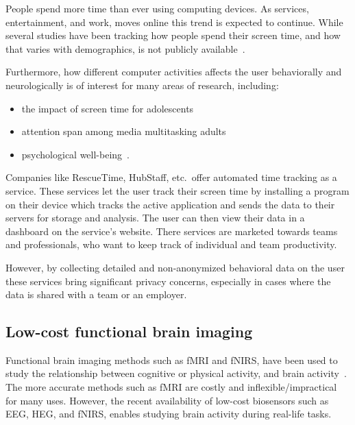 \documentclass{IEEEtran}
\begin{document}
People spend more time than ever using computing devices\cite{TODO}. As services, entertainment, and work, moves online this trend is expected to continue. While several studies have been tracking how people spend their screen time, and how that varies with demographics, is not publicly available~\cite{TODO}.

Furthermore, how different computer activities affects the user behaviorally and neurologically is of interest for many areas of research, including:

\begin{itemize}
  \item the impact of screen time for adolescents~\cite{TODO}
  \item attention span among media multitasking adults~\cite{TODO}
  \item psychological well-being~\cite{huang_time_2017}.
\end{itemize}

Companies like RescueTime, HubStaff, etc.\ offer automated time tracking as a service. These services let the user track their screen time by installing a program on their device which tracks the active application and sends the data to their servers for storage and analysis. The user can then view their data in a dashboard on the service's website. There services are marketed towards teams and professionals, who want to keep track of individual and team productivity.

However, by collecting detailed and non-anonymized behavioral data on the user these services bring significant privacy concerns, especially in cases where the data is shared with a team or an employer.


\subsection{Low-cost functional brain imaging}

Functional brain imaging methods such as fMRI and fNIRS, have been used to study the relationship between cognitive or physical activity, and brain activity~\cite{floyd_decoding_2017}\cite{hong_classification_2015}. The more accurate methods such as fMRI are costly and inflexible/impractical for many uses. However, the recent availability of low-cost biosensors such as EEG, HEG, and fNIRS, enables studying brain activity during real-life tasks.
\end{document}
